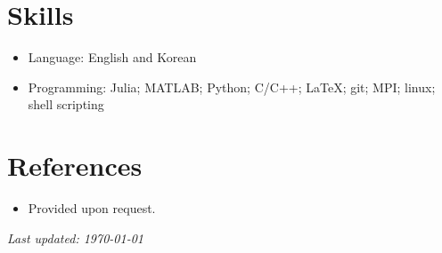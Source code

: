 \documentclass{article}
\begin{document}
\section*{Skills}
\begin{itemize}[leftmargin=*]
\item[] Language: English and Korean
\item[] Programming: Julia; MATLAB; Python; C/C++; \LaTeX; git; MPI; linux; shell scripting
\end{itemize}

\section*{References}
\begin{itemize}[leftmargin=*]
\item[] Provided upon request.
\end{itemize}

{\noindent\it Last updated: \today}
\end{document}
